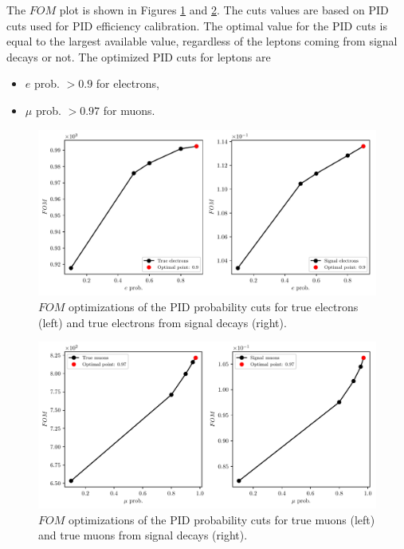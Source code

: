 \documentclass[  headings=standardclasses,
  headings=big,oneside,a4paper,openany,12pt]{scrbook}
\begin{document}
The $FOM$ plot is shown in Figures \ref{fig:efom} and \ref{fig:mufom}. The cuts values are based on PID cuts used for PID efficiency calibration. The optimal value for the PID cuts is equal to the largest available value, regardless of the leptons coming from signal decays or not. The optimized PID cuts for leptons are
\begin{itemize}
\item $e$ prob. $ > 0.9$ for electrons,
\item $\mu$ prob. $ > 0.97$ for muons.
\end{itemize}

\begin{figure}[H]
\centering
\captionsetup{width=.8\linewidth}
\includegraphics[width=\linewidth]{fig/FSP_e_fom}
\caption{$FOM$ optimizations of the PID probability cuts for true electrons (left) and true electrons from signal decays (right).}
\label{fig:efom}
\end{figure}

\begin{figure}[H]
\centering
\captionsetup{width=.8\linewidth}
\includegraphics[width=\linewidth]{fig/FSP_mu_fom}
\caption{$FOM$ optimizations of the PID probability cuts for true muons (left) and true muons from signal decays (right).}
\label{fig:mufom}
\end{figure}
\end{document}
